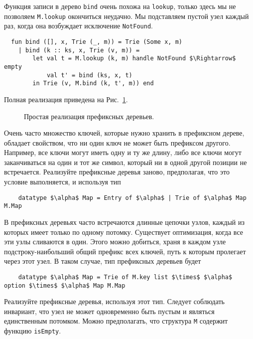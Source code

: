 Функция записи в дерево \lstinline!bind! очень похожа на
\lstinline!lookup!, только здесь мы не позволяем \lstinline!M.lookup!
окончиться неудачно. Мы подставляем пустой узел каждый раз, когда она
возбуждает исключение \lstinline!NotFound!.
\begin{lstlisting}
  fun bind ([], x, Trie (_, m)) = Trie (Some x, m)
    | bind (k :: ks, x, Trie (v, m)) = 
        let val t = M.lookup (k, m) handle NotFound $\Rightarrow$ empty
            val t' = bind (ks, x, t)
        in Trie (v, M.bind (k, t', m)) end
\end{lstlisting}
Полная реализация приведена на Рис.~\ref{fig:10.10}.

\begin{figure}
  \centering
  
  \caption{Простая реализация префиксных деревьев.}
  \label{fig:10.10}
\end{figure}

\begin{exercise}\label{ex:10.9}
  Очень часто множество ключей, которые нужно хранить в префиксном
  дереве, обладает свойством, что ни один ключ не может быть префиксом
  другого. Например, все ключи могут иметь одну и ту же длину, либо
  все ключи могут заканчиваться на один и тот же символ, который ни в
  одной другой позиции не встречается. Реализуйте префиксные деревья
  заново, предполагая, что это условие выполняется, и используя тип
  \begin{lstlisting}
    datatype $\alpha$ Map = Entry of $\alpha$ | Trie of $\alpha$ Map M.Map
  \end{lstlisting}
\end{exercise}

\begin{exercise}\label{ex:10.10}
  В префиксных деревьях часто встречаются длинные цепочки узлов,
  каждый из которых имеет только по одному потомку. Существует
  оптимизация, когда все эти узлы сливаются в один. Этого можно
  добиться, храня в каждом узле подстроку-наибольший общий префикс
  всех ключей, путь к которым пролегает через этот узел. В таком
  случае, тип префиксных деревьев будет
  \begin{lstlisting}
    datatype $\alpha$ Map = Trie of M.key list $\times$ $\alpha$ option $\times$ $\alpha$ Map M.Map
  \end{lstlisting}
  Реализуйте префиксные деревья, используя этот тип. Следует соблюдать
  инвариант, что узел не может одновременно быть пустым и являться
  единственным потомком. Можно предполагать, что структура
  \lstinline!M! содержит функцию \lstinline!isEmpty!.
\end{exercise}


